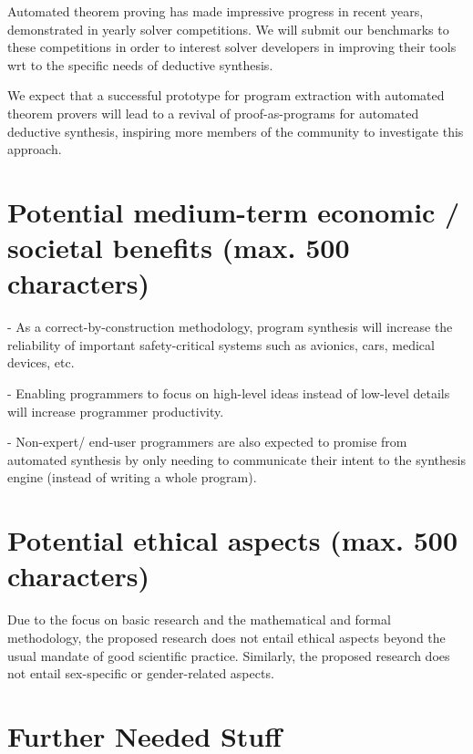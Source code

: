\documentclass[a4paper,12pt]{article}
\begin{document}
Automated theorem proving has made impressive progress in recent years, demonstrated in yearly solver competitions.
We will submit our benchmarks to these competitions in order to interest solver developers in improving their tools wrt to the specific needs of deductive synthesis.

We expect that a successful prototype for program extraction with automated theorem provers will lead to a revival of proof-as-programs for automated deductive synthesis, inspiring more members of the community to investigate this approach.


\section{Potential medium-term economic / societal benefits (max. 500 characters)}

- As a correct-by-construction methodology, program synthesis will increase the reliability of important safety-critical systems such as avionics, cars, medical devices, etc.

\noindent - Enabling programmers to focus on high-level ideas instead of low-level details will increase programmer productivity.

\noindent - Non-expert/ end-user programmers are also expected to promise from automated synthesis by only needing to communicate their intent to the synthesis engine (instead of writing a whole program).


\section{Potential ethical aspects (max. 500 characters)}

Due to the focus on basic research and the mathematical and formal methodology, the proposed research does not entail ethical aspects beyond the usual mandate of good scientific practice.
Similarly, the proposed research does not entail sex-specific or gender-related aspects.

\section{Further Needed Stuff}
\end{document}
